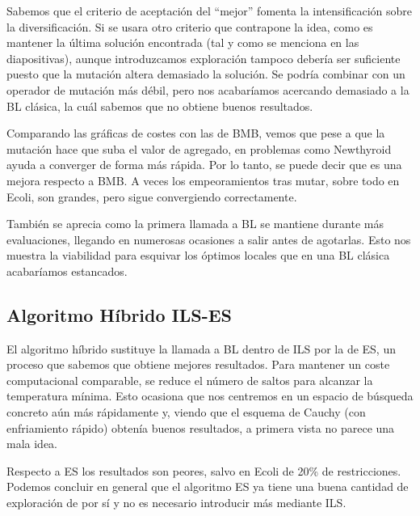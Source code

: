 \vspace{\baselineskip}

Sabemos que el criterio de aceptación del ``mejor'' fomenta la intensificación sobre la diversificación. Si se usara otro criterio que contrapone la idea, como es mantener la última solución encontrada (tal y como se menciona en las diapositivas), aunque introduzcamos exploración tampoco debería ser suficiente puesto que la mutación altera demasiado la solución. Se podría combinar con un operador de mutación más débil, pero nos acabaríamos acercando demasiado a la BL clásica, la cuál sabemos que no obtiene buenos resultados.

\vspace{\baselineskip}

Comparando las gráficas de costes con las de BMB, vemos que pese a que la mutación hace que suba el valor de agregado, en problemas como Newthyroid ayuda a converger de forma más rápida. Por lo tanto, se puede decir que es una mejora respecto a BMB. A veces los empeoramientos tras mutar, sobre todo en Ecoli, son grandes, pero sigue convergiendo correctamente.

También se aprecia como la primera llamada a BL se mantiene durante más evaluaciones, llegando en numerosas ocasiones a salir antes de agotarlas. Esto nos muestra la viabilidad para esquivar los óptimos locales que en una BL clásica acabaríamos estancados.

\subsection{Algoritmo Híbrido ILS-ES}

El algoritmo híbrido sustituye la llamada a BL dentro de ILS por la de ES, un proceso que sabemos que obtiene mejores resultados. Para mantener un coste computacional comparable, se reduce el número de saltos para alcanzar la temperatura mínima.
Esto ocasiona que nos centremos en un espacio de búsqueda concreto aún más rápidamente y, viendo que el esquema de Cauchy (con enfriamiento rápido) obtenía buenos resultados, a primera vista no parece una mala idea.

\vspace{\baselineskip}

Respecto a ES los resultados son peores, salvo en Ecoli de 20\% de restricciones. Podemos concluir en general que el algoritmo ES ya tiene una buena cantidad de exploración de por sí y no es necesario introducir más mediante ILS.

\vspace{\baselineskip}


